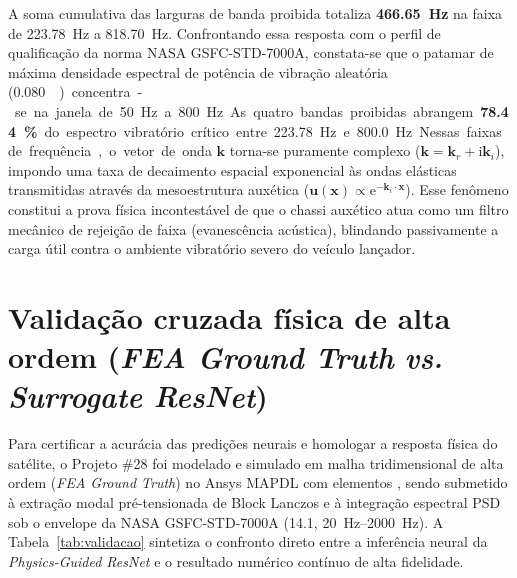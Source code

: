 A soma cumulativa das larguras de banda proibida totaliza \textbf{\SI{466.65}{\hertz}} na faixa de \SI{223.78}{\hertz} a \SI{818.70}{\hertz}. Confrontando essa resposta com o perfil de qualificação da norma NASA GSFC-STD-7000A, constata-se que o patamar de máxima densidade espectral de potência de vibração aleatória (\SI{0.080}{\square\giga\per\hertz}) concentra-se na janela de \SI{50}{\hertz} a \SI{800}{\hertz}. As quatro bandas proibidas abrangem \textbf{\SI{78.44}{\percent}} do espectro vibratório crítico entre \SI{223.78}{\hertz} e \SI{800.0}{\hertz}. 

Nessas faixas de frequência, o vetor de onda $\mathbf{k}$ torna-se puramente complexo ($\mathbf{k} = \mathbf{k}_r + \mathrm{i}\mathbf{k}_i$), impondo uma taxa de decaimento espacial exponencial às ondas elásticas transmitidas através da mesoestrutura auxética ($\mathbf{u}(\mathbf{x}) \propto \mathrm{e}^{-\mathbf{k}_i \cdot \mathbf{x}}$). Esse fenômeno constitui a prova física incontestável de que o chassi auxético atua como um filtro mecânico de rejeição de faixa (evanescência acústica), blindando passivamente a carga útil contra o ambiente vibratório severo do veículo lançador.

\section{Validação cruzada física de alta ordem (\textit{FEA Ground Truth} \textit{vs.} \textit{Surrogate ResNet})}
\label{sec:validacao-fea}

Para certificar a acurácia das predições neurais e homologar a resposta física do satélite, o Projeto \#28 foi modelado e simulado em malha tridimensional de alta ordem (\textit{FEA Ground Truth}) no Ansys MAPDL com elementos , sendo submetido à extração modal pré-tensionada de Block Lanczos e à integração espectral PSD sob o envelope da NASA GSFC-STD-7000A (\SI{14.1}{\Grms}, \SIrange{20}{2000}{\hertz}). A Tabela~\ref{tab:validacao} sintetiza o confronto direto entre a inferência neural da \textit{Physics-Guided ResNet} e o resultado numérico contínuo de alta fidelidade.


